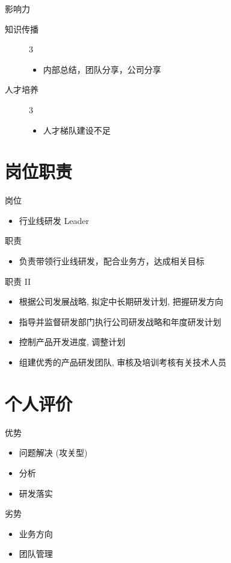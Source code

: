 \documentclass[presentation, bigger]{beamer}
\begin{document}
\begin{frame}[label={sec:org48e65b3}]{影响力}
\begin{description}
\item[{知识传播}] 3
\begin{itemize}
\item 内部总结，团队分享，公司分享
\end{itemize}
\item[{人才培养}] 3
\begin{itemize}
\item 人才梯队建设不足
\end{itemize}
\end{description}
\end{frame}

\section{岗位职责}
\label{sec:orgf8ee7e8}
\begin{frame}[label={sec:org647056e}]{岗位}
\begin{itemize}
\item 行业线研发 Leader
\end{itemize}
\end{frame}
\begin{frame}[label={sec:orgdbf93f1}]{职责}
\begin{itemize}
\item 负责带领行业线研发，配合业务方，达成相关目标
\end{itemize}
\end{frame}
\begin{frame}[label={sec:org0ebd317}]{职责 II}
\begin{itemize}
\item 根据公司发展战略, 拟定中长期研发计划, 把握研发方向
\item 指导并监督研发部门执行公司研发战略和年度研发计划
\item 控制产品开发进度, 调整计划
\item 组建优秀的产品研发团队, 审核及培训考核有关技术人员
\end{itemize}
\end{frame}

\section{个人评价}
\label{sec:orge325ff5}
\begin{frame}[label={sec:org98e09da}]{优势}
\begin{itemize}
\item 问题解决 (攻关型)
\item 分析
\item 研发落实
\end{itemize}
\end{frame}

\begin{frame}[label={sec:org4edfe47}]{劣势}
\begin{itemize}
\item 业务方向
\item 团队管理
\end{itemize}
\end{frame}
\end{document}
